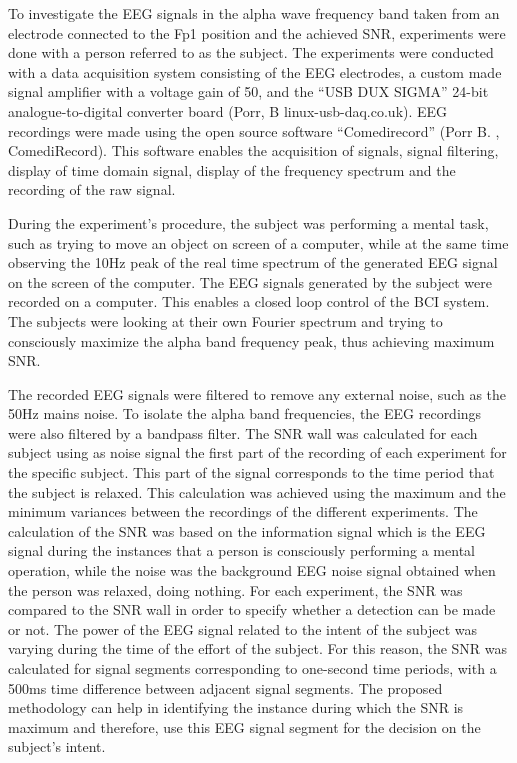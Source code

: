 To investigate the EEG signals in the alpha wave frequency band taken from an electrode connected to the Fp1 position and the achieved SNR, experiments were done with a person referred to as the subject. The experiments were conducted with a data acquisition system consisting of the EEG electrodes, a custom made signal amplifier with a voltage gain of 50, and the “USB DUX SIGMA” 24-bit analogue-to-digital converter board (Porr, B linux-usb-daq.co.uk). EEG recordings were made using the open source software “Comedirecord” (Porr B. , ComediRecord). This software enables the acquisition of signals, signal filtering, display of time domain signal, display of the frequency spectrum and the recording of the raw signal.
 
 During the experiment’s procedure, the subject was performing a mental task, such as trying to move an object on screen of a computer, while at the same time observing the 10Hz peak of the real time spectrum of the generated EEG signal on the screen of the computer. The EEG signals generated by the subject were recorded on a computer. This enables a closed loop control of the BCI system. The subjects were looking at their own Fourier spectrum and trying to consciously maximize the alpha band frequency peak, thus achieving maximum SNR.

The recorded EEG signals were filtered to remove any external noise, such as the 50Hz mains noise. To isolate the alpha band frequencies, the EEG recordings were also filtered by a bandpass filter. The SNR wall was calculated for each subject using as noise signal the first part of the recording of each experiment for the specific subject. This part of the signal corresponds to the time period that the subject is relaxed. This calculation was achieved using the maximum and the minimum variances between the recordings of the different experiments. The calculation of the SNR was based on the information signal which is the EEG signal during the instances that a person is consciously performing a mental operation, while the noise was the background EEG noise signal obtained when the person was relaxed, doing nothing. For each experiment, the SNR was compared to the SNR wall in order to specify whether a detection can be made or not. The power of the EEG signal related to the intent of the subject was varying during the time of the effort of the subject. For this reason, the SNR was calculated for signal segments corresponding to one-second time periods, with a 500ms time difference between adjacent signal segments. The proposed methodology can help in identifying the instance during which the SNR is maximum and therefore, use this EEG signal segment for the decision on the subject’s intent.

